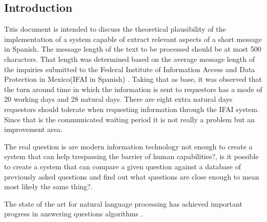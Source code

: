 \documentclass[twoside]{article}
\begin{document}
\begin{multicols}{2} %

\section{Introduction}
\lettrine[nindent=0em,lines=3]{T}his document is intended to discuss the theoretical plausibility of the implementation of a system capable of extract relevant aspects of a short message in Spanish. The message length of the text to be processed should be at most 500 %
characters. That length was determined based on the average message length of the inquiries submitted to the Federal Institute of Information Access and Data Protection in Mexico(IFAI in Spanish)\cite{IFAI:2014} . Taking that as base, it was observed that the turn around time in which the information is sent to requestors has a mode of 20 working days and 28 natural days. There are eight extra natural days requestors should tolerate when requesting information through the IFAI system. Since that is the communicated waiting period it is not really a problem but an improvement area.

The real question is are modern information technology not enough to create a system that can help trespassing the barrier of human capabilities?, is it possible to create a system that can compare a given question against a database of previously asked questions and find out what questions are close enough to mean most likely the same thing?. 

The state of the art for natural language processing has achieved important progress in answering questions algorithms%
. 

\end{multicols}
\end{document}

